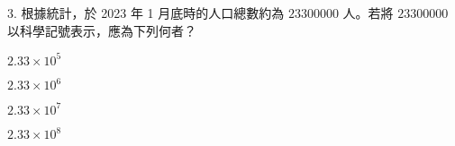 \documentclass[12pt]{article}
\begin{document}
\begin{problem}
  \item[3.] 根據統計，於 2023 年 1 月底時的人口總數約為 $23300000$ 人。若將 $23300000$ 以科學記號表示，應為下列何者？
  \begin{choices}
    \item $2.33 \times 10^5$
    \item $2.33 \times 10^6$
    \item $2.33 \times 10^7$
    \item $2.33 \times 10^8$
  \end{choices}
\end{problem}
\end{document}
